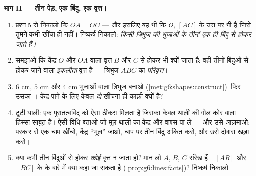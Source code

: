 \begin{problem}
\medskip
\noindent\textbf{भाग II --- तीन पेड़, एक बिंदु, एक
वृत्त।}
\begin{enumerate}[resume]
  \item प्रश्न 5 से निकालो कि $OA = OC$ --- और इसलिए यह भी कि
        $O$, $[AC]$ के उस  पर भी है जिसे तुमने
        कभी खींचा ही नहीं। निष्कर्ष निकालो: \emph{किसी त्रिभुज
        की भुजाओं के तीनों  एक ही बिंदु से होकर
        जाते हैं।}
  \item समझाओ कि केंद्र $O$ और  $OA$ वाला वृत्त $B$ और
        $C$ से होकर भी क्यों जाता है: वही तीनों बिंदुओं से होकर
        जाने वाला \emph{इकलौता} वृत्त है --- त्रिभुज $ABC$ का
        \emph{परिवृत्त}।
  \item $6$ cm, $5$ cm और $4$ cm भुजाओं वाला त्रिभुज बनाओ
        (\cref{met:g6:shapes:construct}), फिर उसका
        । केंद्र पाने के लिए केवल \emph{दो}  खींचना ही काफ़ी क्यों है?
  \item टूटी थाली: एक पुरातत्वविद् को ऐसा ठीकरा मिलता है जिसका
        केवल थाली की गोल कोर वाला हिस्सा साबुत है। ऐसी विधि
        बताओ जो मूल थाली का केंद्र और  वापस पा ले ---
        और उसे आज़माओ: परकार से एक चाप खींचो, केंद्र ``भूल''
        जाओ, चाप पर तीन बिंदु अंकित करो, और उसे दोबारा खड़ा करो।
  \item क्या कभी तीन बिंदुओं से होकर \emph{कोई} वृत्त न जाता
        हो? मान लो $A$, $B$, $C$ संरेख हैं। $[AB]$ और $[BC]$ के
         के बारे में क्या कहा जा सकता है
        (\cref{prop:g6:lines:facts})? निष्कर्ष निकालो।
\end{enumerate}


\end{problem}
